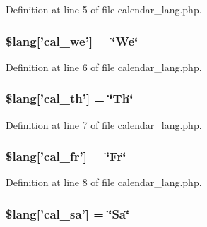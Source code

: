 Definition at line 5 of file calendar\-\_\-lang.\-php.

\hypertarget{calendar__lang_8php_acfa4ce5b6c72a960be91a2ebd7049e51}{
\subsubsection[{\$lang}]{\setlength{\rightskip}{0pt plus 5cm}\$lang\mbox{[}'cal\-\_\-we'\mbox{]} = \char`\"{}We\char`\"{}}}\label{calendar__lang_8php_acfa4ce5b6c72a960be91a2ebd7049e51}


Definition at line 6 of file calendar\-\_\-lang.\-php.

\hypertarget{calendar__lang_8php_af5b11785dc4aa3ef3df6a3fe1d3158c4}{
\subsubsection[{\$lang}]{\setlength{\rightskip}{0pt plus 5cm}\$lang\mbox{[}'cal\-\_\-th'\mbox{]} = \char`\"{}Th\char`\"{}}}\label{calendar__lang_8php_af5b11785dc4aa3ef3df6a3fe1d3158c4}


Definition at line 7 of file calendar\-\_\-lang.\-php.

\hypertarget{calendar__lang_8php_a7edbb0ca2d2bf43cf32e8b946d87831d}{
\subsubsection[{\$lang}]{\setlength{\rightskip}{0pt plus 5cm}\$lang\mbox{[}'cal\-\_\-fr'\mbox{]} = \char`\"{}Fr\char`\"{}}}\label{calendar__lang_8php_a7edbb0ca2d2bf43cf32e8b946d87831d}


Definition at line 8 of file calendar\-\_\-lang.\-php.

\hypertarget{calendar__lang_8php_a16c4faf67e8c4d3aff3fbd1cd831a0d1}{
\subsubsection[{\$lang}]{\setlength{\rightskip}{0pt plus 5cm}\$lang\mbox{[}'cal\-\_\-sa'\mbox{]} = \char`\"{}Sa\char`\"{}}}\label{calendar__lang_8php_a16c4faf67e8c4d3aff3fbd1cd831a0d1}


